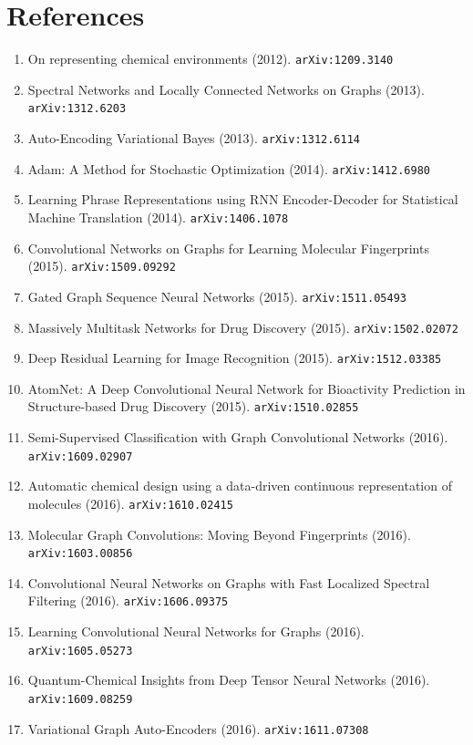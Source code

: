 \documentclass[11pt]{article}
\begin{document}
\section*{References}
\begin{enumerate}\small
  \item On representing chemical environments (2012). \texttt{arXiv:1209.3140}
  \item Spectral Networks and Locally Connected Networks on Graphs (2013). \texttt{arXiv:1312.6203}
  \item Auto-Encoding Variational Bayes (2013). \texttt{arXiv:1312.6114}
  \item Adam: A Method for Stochastic Optimization (2014). \texttt{arXiv:1412.6980}
  \item Learning Phrase Representations using RNN Encoder-Decoder for
  Statistical Machine Translation (2014). \texttt{arXiv:1406.1078}
  \item Convolutional Networks on Graphs for Learning Molecular Fingerprints (2015). \texttt{arXiv:1509.09292}
  \item Gated Graph Sequence Neural Networks (2015). \texttt{arXiv:1511.05493}
  \item Massively Multitask Networks for Drug Discovery (2015). \texttt{arXiv:1502.02072}
  \item Deep Residual Learning for Image Recognition (2015). \texttt{arXiv:1512.03385}
  \item AtomNet: A Deep Convolutional Neural Network for Bioactivity Prediction
  in Structure-based Drug Discovery (2015). \texttt{arXiv:1510.02855}
  \item Semi-Supervised Classification with Graph Convolutional Networks (2016). \texttt{arXiv:1609.02907}
  \item Automatic chemical design using a data-driven continuous representation
  of molecules (2016). \texttt{arXiv:1610.02415}
  \item Molecular Graph Convolutions: Moving Beyond Fingerprints (2016). \texttt{arXiv:1603.00856}
  \item Convolutional Neural Networks on Graphs with Fast Localized Spectral
  Filtering (2016). \texttt{arXiv:1606.09375}
  \item Learning Convolutional Neural Networks for Graphs (2016). \texttt{arXiv:1605.05273}
  \item Quantum-Chemical Insights from Deep Tensor Neural Networks (2016). \texttt{arXiv:1609.08259}
  \item Variational Graph Auto-Encoders (2016). \texttt{arXiv:1611.07308}

\end{enumerate}
\end{document}

